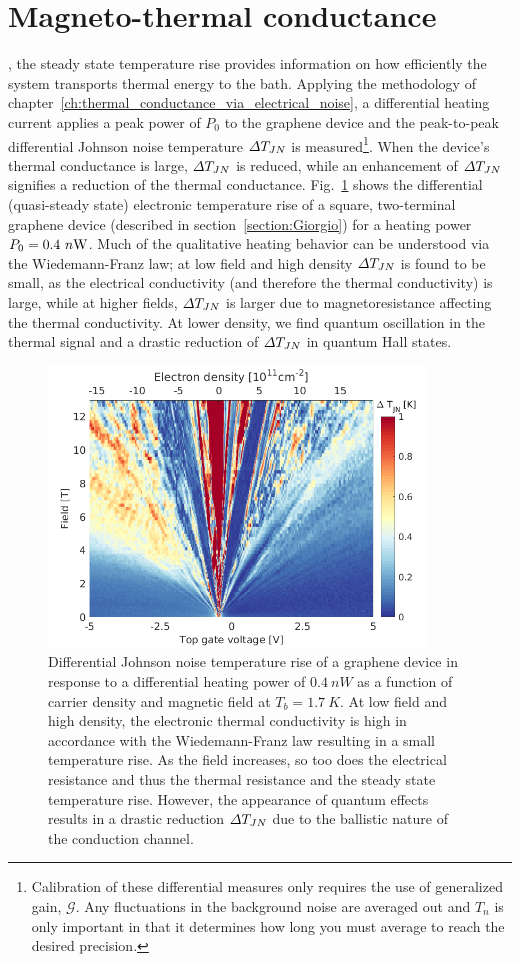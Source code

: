 \section{Magneto-thermal conductance}
\label{section:magneto-thermal_conductance}
, the steady state temperature rise provides information on how efficiently the system transports thermal energy to the bath. Applying the methodology of chapter~\ref{ch:thermal_conductance_via_electrical_noise}, a differential heating current applies a peak power of $P_0$ to the graphene device and the peak-to-peak differential Johnson noise temperature $\Delta T_{JN}$ is measured\footnote{Calibration of these differential measures only requires the use of generalized gain, $\mathcal{G}$. Any fluctuations in the background noise are averaged out and $T_n$ is only important in that it determines how long you must average to reach the desired precision.}. When the device's thermal conductance is large, $\Delta T_{JN}$ is reduced, while an enhancement of $\Delta T_{JN}$ signifies a reduction of the thermal conductance. Fig.~\ref{fig:m_DT} shows the differential (quasi-steady state) electronic temperature rise of a square, two-terminal graphene device (described in section~\ref{section:Giorgio}) for a heating power $P_0 = 0.4~n\mathrm{W}$. Much of the qualitative heating behavior can be understood via the Wiedemann-Franz law; at low field and high density $\Delta T_{JN}$ is found to be small, as the electrical conductivity (and therefore the thermal conductivity) is large, while at higher fields, $\Delta T_{JN}$ is larger due to magnetoresistance affecting the thermal conductivity. At lower density, we find quantum oscillation in the thermal signal and a drastic reduction of $\Delta T_{JN}$ in quantum Hall states.
\begin{figure}
\centering
\includegraphics[width=100mm]{figures/magneto/Fan_DT.png}
\caption{Differential Johnson noise temperature rise of a graphene device in response to a differential heating power of $0.4~nW$ as a function of carrier density and magnetic field at $T_b=1.7~K$. At low field and high density, the electronic thermal conductivity is high in accordance with the Wiedemann-Franz law resulting in a small temperature rise. As the field increases, so too does the electrical resistance and thus the thermal resistance and the steady state temperature rise. However, the appearance of quantum effects results in a drastic reduction $\Delta T_{JN}$ due to the  ballistic nature of the conduction channel.}
\label{fig:m_DT}
\end{figure}


